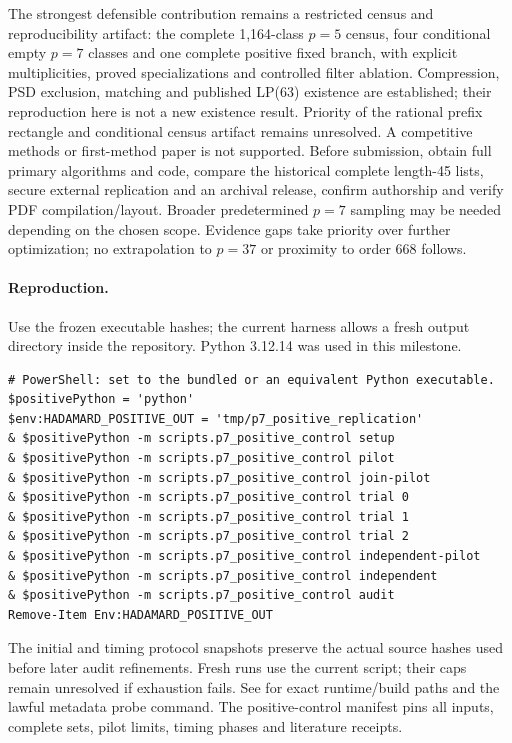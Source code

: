 \documentclass[11pt]{article}
\begin{document}
The strongest defensible contribution remains a restricted census and
reproducibility artifact: the complete 1,164-class $p=5$ census, four
conditional empty $p=7$ classes and one complete positive fixed branch,
with explicit multiplicities, proved specializations and controlled filter
ablation. Compression, PSD exclusion, matching and published LP(63)
existence are established; their reproduction here is not a new existence
result. Priority of the rational prefix rectangle and conditional census
artifact remains unresolved. A competitive methods or first-method paper
is not supported. Before submission, obtain full primary algorithms and
code, compare the historical complete length-45 lists, secure external
replication and an archival release, confirm authorship and verify PDF
compilation/layout. Broader predetermined $p=7$ sampling may be needed
depending on the chosen scope. Evidence gaps take priority over further
optimization; no extrapolation to $p=37$ or proximity to order 668 follows.

\paragraph{Reproduction.}
Use the frozen executable hashes; the current harness allows a fresh output
directory inside the repository. Python 3.12.14 was used in this milestone.
\begin{verbatim}
# PowerShell: set to the bundled or an equivalent Python executable.
$positivePython = 'python'
$env:HADAMARD_POSITIVE_OUT = 'tmp/p7_positive_replication'
& $positivePython -m scripts.p7_positive_control setup
& $positivePython -m scripts.p7_positive_control pilot
& $positivePython -m scripts.p7_positive_control join-pilot
& $positivePython -m scripts.p7_positive_control trial 0
& $positivePython -m scripts.p7_positive_control trial 1
& $positivePython -m scripts.p7_positive_control trial 2
& $positivePython -m scripts.p7_positive_control independent-pilot
& $positivePython -m scripts.p7_positive_control independent
& $positivePython -m scripts.p7_positive_control audit
Remove-Item Env:HADAMARD_POSITIVE_OUT
\end{verbatim}
The initial and timing protocol snapshots preserve the actual source hashes
used before later audit refinements. Fresh runs use the current script;
their caps remain unresolved if exhaustion fails. See
 for exact runtime/build paths and the
lawful metadata probe command. The positive-control manifest pins all
inputs, complete sets, pilot limits, timing phases and literature receipts.
\end{document}
